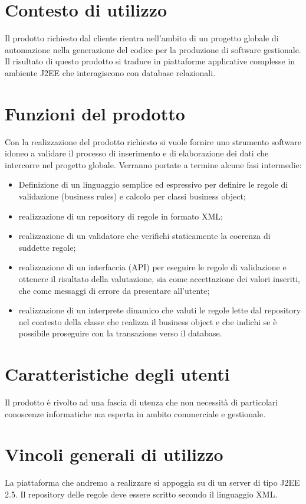 \documentclass[11pt,titlepage,a4paper]{report}
\begin{document}
\section{Contesto di utilizzo}
Il prodotto richiesto dal cliente rientra nell'ambito di un progetto globale di automazione nella generazione del codice per la produzione di software gestionale. Il risultato di questo prodotto si traduce in piattaforme applicative complesse in ambiente J2EE che interagiscono con database relazionali. 
\section{Funzioni del prodotto}
Con la realizzazione del prodotto richiesto si vuole fornire uno strumento software idoneo a validare il processo di inserimento e di elaborazione dei dati che intercorre nel progetto globale. Verranno portate a termine alcune fasi intermedie:
\begin{itemize}
\item{}Definizione di un linguaggio semplice ed espressivo per definire le regole di validazione (business rules) e calcolo per classi business object;
\item{}realizzazione di un repository di regole in formato XML;
\item{}realizzazione di un validatore che verifichi staticamente la coerenza di suddette regole;
\item{}realizzazione di un interfaccia (API) per eseguire le regole di validazione e ottenere il risultato della valutazione, sia come accettazione dei valori inseriti, che come messaggi di errore da presentare all'utente;
\item{}realizzazione di un interprete dinamico che valuti le regole lette dal repository nel contesto della classe che realizza il business object e che indichi se \`e possibile proseguire con la transazione verso il database.
\end{itemize}
\section{Caratteristiche degli utenti}
Il prodotto \`e rivolto ad una fascia di utenza che non necessit\`a di particolari conoscenze informatiche ma esperta in ambito commerciale e gestionale. 
\section{Vincoli generali di utilizzo}
La piattaforma che andremo a realizzare si appoggia su di un server di tipo J2EE 2.5.
Il repository delle regole deve essere scritto secondo il linguaggio XML.
\end{document}
